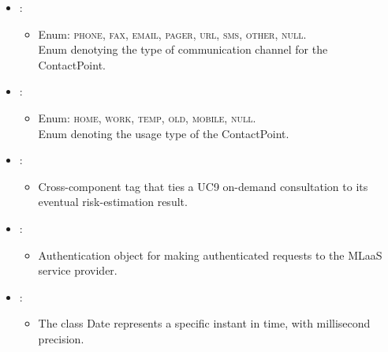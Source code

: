 \begin{itemize}[nolistsep,noitemsep]
\begin{itemize}
\end{itemize}

\item {}: 
\begin{itemize}[noitemsep,nolistsep]

\item[] Enum: \textsc{phone}, \textsc{fax}, \textsc{email}, \textsc{pager}, \textsc{url}, \textsc{sms}, \textsc{other}, \textsc{null}.\\Enum denotying the type of communication channel for the ContactPoint.
\end{itemize}

\item {}: 
\begin{itemize}[noitemsep,nolistsep]

\item[] Enum: \textsc{home}, \textsc{work}, \textsc{temp}, \textsc{old}, \textsc{mobile}, \textsc{null}.\\Enum denoting the usage type of the ContactPoint.
\end{itemize}

\item {}: 
\begin{itemize}[noitemsep,nolistsep]

\item[] Cross-component tag that ties a UC9 on-demand consultation to its eventual risk-estimation result.
\end{itemize}

\item {}: 
\begin{itemize}[noitemsep,nolistsep]

\item[] Authentication object for making authenticated requests to the MLaaS service provider.
\end{itemize}

\item {}: 
\begin{itemize}[noitemsep,nolistsep]

\item[] The class Date represents a specific instant in time, with millisecond precision. 
\end{itemize}


\end{itemize}
